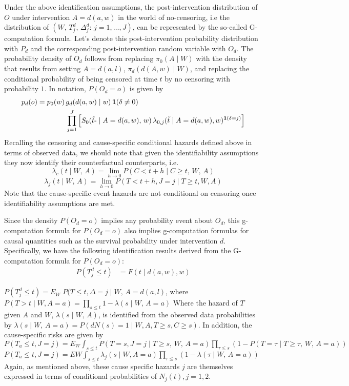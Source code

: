\documentclass{report}
\newcommand{\1}{\ensuremath{\mathbf{1}}}
\renewcommand{\t}{\ensuremath{\Tilde{t}}}
\newcommand{\g}{\ensuremath{\pi}}
\renewcommand{\L}{\ensuremath{W}}
\renewcommand{\l}{\ensuremath{w}}
\begin{document}
Under the above identification assumptions, the post-intervention distribution of \(O\) under intervention \(A=d(a, \l)\) in the world of no-censoring, i.e the distribution of \((\L,\, T^d_j,\, \Delta^d_j :\, j = 1, \dots, J)\), can be represented by the so-called G-computation formula. Let’s denote this post-intervention probability distribution with \(P_{d}\) and the corresponding post-intervention random variable with \(O_d\). The probability density of \(O_d\) follows from replacing \(\g_0(A \mid \L)\) with the density that results from setting \(A = d(a, l)\), \(\g_d(d(A, \l) \mid \L)\), and replacing the conditional probability of being censored at time \(t\) by no censoring with probability \(1\). In notation, \(P(O_d = o)\) is given by
\begin{align*}
p_{d}(o) = p_{0}(\l) \, &g_d(d(a, \l) \mid \l) \, \1(\delta \neq 0)\\
&\prod_{j=1}^{J} \left[S_{0}(\t\text{-} \mid A = d(a, \l),\, \l) \, \lambda_{0,j}(\t \mid A = d(a, \l), \l)^{\1(\delta = j)} \right]
\end{align*}
Recalling the censoring and cause-specific conditional hazards defined above in terms of observed data, we should note that given the identifiability assumptions they now identify their counterfactual counterparts, i.e. 
\[\lambda_{c}(t \mid W,\, A) = \lim_{h \to 0}P(C < t + h \mid C \geq t,\, W,\, A)\]
\[\lambda_{j}(t \mid W,\, A)= \lim_{h \to 0}P(T < t+h, J=j \mid T \geq t, W, A)\]
Note that the cause-specific event hazards are not conditional on censoring once identifiability assumptions are met.

Since the density \(P(O_d=o)\) implies any probability event about \(O_d\), this g-computation formula for \(P(O_d=o)\) also implies g-computation formulas for causal quantities such as the survival probability under intervention \(d\). Specifically, we have the following identification results derived from the G-computation formula for \(P(O_d=o)\):
\begin{align*}
P\left(T^d_{j} \leq t\right) &= F(t \mid d(a, \l), \l)
\end{align*}

\(P(T^d_{j} \leq t)=E_{\L} \; P(T \leq t, \Delta = j \mid \L,\, A=d(a, l)\), where \(P(T>t \mid W, A=a) = \prod_{s \leq t} 1 -\lambda(s \mid W,\, A=a)\)
Where the hazard of \(T\) given \(A\) and \(W\), \(\lambda(s \mid W,\, A)\), is identified from the observed data probabilities by \(\lambda(s \mid W,\, A=a) = P(dN(s)=1 \mid W, A, T \geq s, C \geq s)\). In addition, the cause-specific risks are given by 
\(P(T_{a} \leq t, J=j)=E_{W} \int_{s \leq t} P(T=s, J=j \mid T \geq s,\, W,\, A=a) \prod_{\tau \leq s} (1 - P(T= \tau \mid T \geq \tau,\, W,\, A=a))\) 
\(P(T_{a} \leq t, J=j) = E{W} \int_{s \leq t} \lambda_{j}(s \mid W, A=a) \prod_{\tau \leq s} (1-\lambda(\tau \mid W,\, A=a))\) 
Again, as mentioned above, these cause specific hazards \(j\) are themselves expressed in terms of conditional probabilities of \(N_{j}(t), j=1, 2\).
\end{document}
